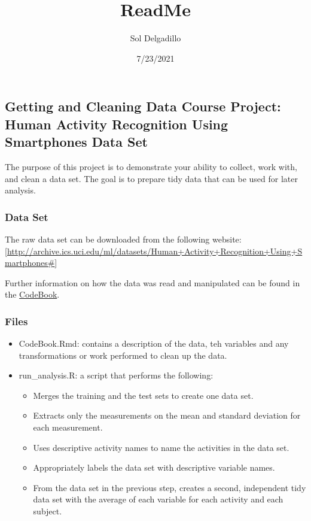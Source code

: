 \documentclass[
]{article}
\title{ReadMe}
\author{Sol Delgadillo}
\date{7/23/2021}
\begin{document}
\maketitle

\hypertarget{getting-and-cleaning-data-course-project-human-activity-recognition-using-smartphones-data-set}{%
\subsection{Getting and Cleaning Data Course Project: Human Activity
Recognition Using Smartphones Data
Set}\label{getting-and-cleaning-data-course-project-human-activity-recognition-using-smartphones-data-set}}

The purpose of this project is to demonstrate your ability to collect,
work with, and clean a data set. The goal is to prepare tidy data that
can be used for later analysis.

\hypertarget{data-set}{%
\subsubsection{Data Set}\label{data-set}}

The raw data set can be downloaded from the following website:
{[}\url{http://archive.ics.uci.edu/ml/datasets/Human+Activity+Recognition+Using+Smartphones\#}{]}

Further information on how the data was read and manipulated can be
found in the \href{CodeBook.Rmd}{CodeBook}.

\hypertarget{files}{%
\subsubsection{Files}\label{files}}

\begin{itemize}
\item
  CodeBook.Rmd: contains a description of the data, teh variables and
  any transformations or work performed to clean up the data.
\item
  run\_analysis.R: a script that performs the following:

  \begin{itemize}
  \item
    Merges the training and the test sets to create one data set.
  \item
    Extracts only the measurements on the mean and standard deviation
    for each measurement.
  \item
    Uses descriptive activity names to name the activities in the data
    set.
  \item
    Appropriately labels the data set with descriptive variable names.
  \item
    From the data set in the previous step, creates a second,
    independent tidy data set with the average of each variable for each
    activity and each subject.
  \end{itemize}
\end{itemize}
\end{document}
